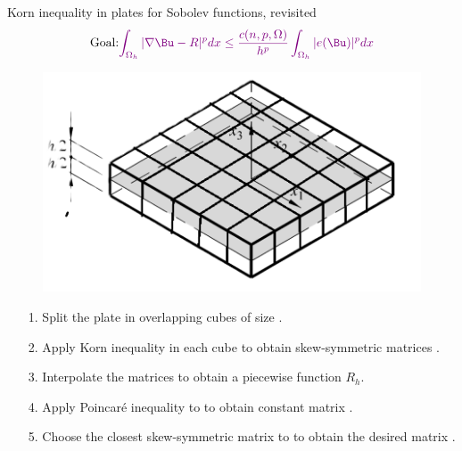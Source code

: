 \documentclass{beamer}
\begin{document}
\begin{frame}{Korn inequality in plates for Sobolev functions, revisited}
    $$\text{Goal:} \textcolor{violet}{
        \int_{\Omega_h}|\nabla \Bu-R|^p dx \leq \frac{c(n, p, \Omega)}{h^p} \int_{\Omega_h} |e(\Bu)|^p dx
    }$$\pause
  \begin{minipage}{0.4\textwidth}
    \begin{figure}
        \includegraphics[scale=0.3]{figures/plate.png}
    \end{figure}
\end{minipage}
\begin{minipage}{0.58\textwidth}
    \begin{itemize}
        \item[1.] Split the plate in  overlapping cubes of size .
        \vfill\pause
        \item[2.] Apply  Korn inequality in each cube to obtain skew-symmetric matrices .
        \vfill
    \end{itemize}
\end{minipage}
\begin{itemize}
        \item[3.] Interpolate the matrices  to obtain a piecewise function $R_h$.
        \vfill
        \item[4.] Apply Poincaré inequality to  to obtain constant matrix .
        \vfill
        \item[5.] Choose the closest skew-symmetric matrix to  to obtain the desired matrix .
    \end{itemize}

\end{frame}
\end{document}
